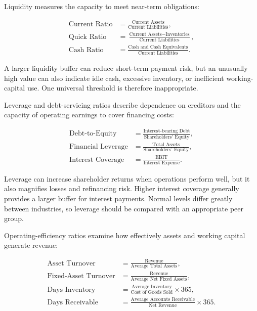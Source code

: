 Liquidity measures the capacity to meet near-term obligations:

\begin{align}
    \text{Current Ratio}
      &=\frac{\text{Current Assets}}{\text{Current Liabilities}}, \\
    \text{Quick Ratio}
      &=\frac{\text{Current Assets}-\text{Inventories}}
              {\text{Current Liabilities}}, \\
    \text{Cash Ratio}
      &=\frac{\text{Cash and Cash Equivalents}}
              {\text{Current Liabilities}}.
    \label{eq:fundamental-liquidity}
\end{align}

A larger liquidity buffer can reduce short-term payment risk, but an unusually high value can also indicate idle cash, excessive inventory, or inefficient working-capital use. One universal threshold is therefore inappropriate.

Leverage and debt-servicing ratios describe dependence on creditors and the capacity of operating earnings to cover financing costs:

\begin{align}
    \text{Debt-to-Equity}
      &=\frac{\text{Interest-bearing Debt}}
              {\text{Shareholders' Equity}}, \\
    \text{Financial Leverage}
      &=\frac{\text{Total Assets}}
              {\text{Shareholders' Equity}}, \\
    \text{Interest Coverage}
      &=\frac{\text{EBIT}}{\text{Interest Expense}}.
    \label{eq:fundamental-leverage}
\end{align}

Leverage can increase shareholder returns when operations perform well, but it also magnifies losses and refinancing risk. Higher interest coverage generally provides a larger buffer for interest payments. Normal levels differ greatly between industries, so leverage should be compared with an appropriate peer group.

Operating-efficiency ratios examine how effectively assets and working capital generate revenue:

\begin{align}
    \text{Asset Turnover}
      &=\frac{\text{Revenue}}{\text{Average Total Assets}}, \\
    \text{Fixed-Asset Turnover}
      &=\frac{\text{Revenue}}{\text{Average Net Fixed Assets}}, \\
    \text{Days Inventory}
      &=\frac{\text{Average Inventory}}{\text{Cost of Goods Sold}}\times365, \\
    \text{Days Receivable}
      &=\frac{\text{Average Accounts Receivable}}{\text{Net Revenue}}\times365.
    \label{eq:fundamental-efficiency}
\end{align}

